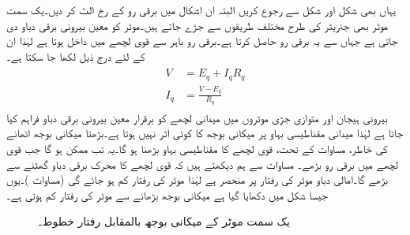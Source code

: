 یہاں بھی شکل   اور شکل   سے رجوع کریں البتہ ان اشکال میں برقی رو کے رخ الٹ کر دیں۔یک سمت  موٹر بھی جنریٹر کی طرح مختلف طریقوں سے جڑے جاتے ہیں۔موٹر کو معین بیرونی برقی دباو دی جاتی ہے جہاں سے یہ برقی رو حاصل کرتا ہے۔برقی رو باہر سے قوی لچھے میں داخل ہوتا ہے لہٰذا ان کے لئے درج ذیل لکھا جا سکتا ہے۔
\begin{gather}
\begin{aligned}\label{مساوات_یکسمتی_دباو_رو_قوی_سلسلہ_وار}
V&=E_q+I_q R_q\\
I_q&=\frac{V-E_q}{R_q}
\end{aligned}
\end{gather}
بیرونی ہیجان اور متوازی جڑی موٹروں میں میدانی لچھے کو برقرار معین بیرونی برقی دباو فراہم کیا جاتا ہے لہٰذا میدانی مقناطیسی بہاو پر میکانی بوجھ کا کوئی اثر نہیں ہوتا ہے۔بڑھتا میکانی بوجھ اٹھانے کی خاطر، مساوات    کے تحت، قوی لچھے کا مقناطیسی بہاو بڑھنا ہو گا۔یہ تب ممکن ہو گا جب قوی لچھے میں برقی رو بڑھے۔ مساوات   سے ہم دیکھتے ہیں کہ قوی لچھے کا محرک برقی دباو   گھٹنے سے   بڑھے گا۔امالی دباو  موٹر کی رفتار پر منحصر ہے   لہٰذا موٹر کی رفتار کم ہو جائے گی (مساوات )۔یوں جیسا  شکل    میں  دکھایا گیا ہے میکانی بوجھ بڑھانے سے موٹر کی رفتار کم ہوتی ہے۔
\begin{figure}
\centering
\newcommand\DrawControl[3]{
  node[#2,circle,fill=#2,inner sep=2pt,label={above:$#1$},label={[black]below:{\footnotesize#3}}] at #1 {}
}
%
\caption{یک سمت  موٹر کے میکانی بوجھ بالمقابل رفتار خطوط۔}
\label{شکل_یکسمتی_موٹر_رفتار_بالمقابل_بار}
\end{figure}

